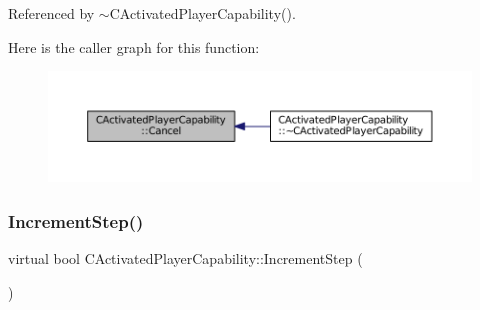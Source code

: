 Referenced by $\sim$\+C\+Activated\+Player\+Capability().

Here is the caller graph for this function\+:\nopagebreak
\begin{figure}[H]
\begin{center}
\leavevmode
\includegraphics[width=350pt]{classCActivatedPlayerCapability_a5cde83be468e262ad054d81e28684a81_icgraph}
\end{center}
\end{figure}
\hypertarget{classCActivatedPlayerCapability_a943b5999a57504399293250382c0ec6a}{}\label{classCActivatedPlayerCapability_a943b5999a57504399293250382c0ec6a} 
\subsubsection{\texorpdfstring{Increment\+Step()}{IncrementStep()}}
{\footnotesize\ttfamily virtual bool C\+Activated\+Player\+Capability\+::\+Increment\+Step (\begin{DoxyParamCaption}{ }\end{DoxyParamCaption})\hspace{0.3cm}{\ttfamily [pure virtual]}}



